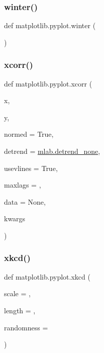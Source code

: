 \mbox{\label{namespacematplotlib_1_1pyplot_a7831fe2d08b1a131ba61cb0cacacc94f}} 
\subsubsection{\texorpdfstring{winter()}{winter()}}
{\footnotesize\ttfamily def matplotlib.\+pyplot.\+winter (\begin{DoxyParamCaption}{ }\end{DoxyParamCaption})}

\mbox{\label{namespacematplotlib_1_1pyplot_a29dc13c8e00fb5e9463384fb3ac2bb03}} 
\subsubsection{\texorpdfstring{xcorr()}{xcorr()}}
{\footnotesize\ttfamily def matplotlib.\+pyplot.\+xcorr (\begin{DoxyParamCaption}\item[{}]{x,  }\item[{}]{y,  }\item[{}]{normed = {\ttfamily True},  }\item[{}]{detrend = {\ttfamily \hyperlink{namespacematplotlib_1_1mlab_a359979aa8e0e635738648ca88ebd5e1d}{mlab.\+detrend\+\_\+none}},  }\item[{}]{usevlines = {\ttfamily True},  }\item[{}]{maxlags = {},  }\item[{}]{data = {\ttfamily None},  }\item[{}]{kwargs }\end{DoxyParamCaption})}

\mbox{\label{namespacematplotlib_1_1pyplot_a624b39398a7ee2d744eb1fc7048bfdd7}} 
\subsubsection{\texorpdfstring{xkcd()}{xkcd()}}
{\footnotesize\ttfamily def matplotlib.\+pyplot.\+xkcd (\begin{DoxyParamCaption}\item[{}]{scale = {},  }\item[{}]{length = {},  }\item[{}]{randomness = {} }\end{DoxyParamCaption})}

